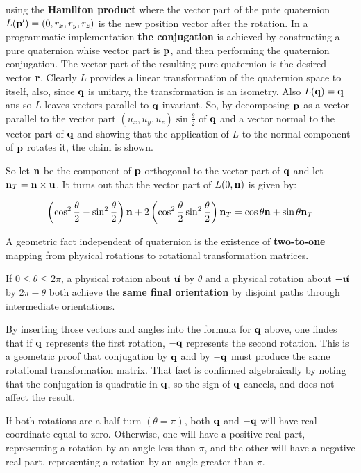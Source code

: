 using the \textbf{Hamilton product} where the vector part of the pute quaternion
$ L(\mathbf{p}') = (0, r_x, r_y, r_z) $ is the new position vector after the rotation.
In a programmatic implementation \textbf{the conjugation} is achieved by constructing
a pure quaternion whise vector part is $ \mathbf{p} $, and then performing the quaternion
conjugation. The vector part of the resulting pure quaternion is the desired
vector $ \mathbf{r} $. Clearly $ L $ provides a linear transformation of the quaternion
space to itself, also, since $ \mathbf{q} $ is unitary, the transformation is an
isometry. Also $ L(\mathbf{q}) = \mathbf{q} $ ans so $ L $ leaves vectors parallel to
$ \mathbf{q} $ invariant. So, by decomposing $ \mathbf{p} $ as a vector parallel to the
vector part $ (u_x, u_y, u_z) \sin \frac{\theta}{2} $ of $ \mathbf{q} $ and a vector
normal to the vector part of $ \mathbf{q} $ and showing that the application of
$ L $ to the normal component of $ \mathbf{p} $ rotates it, the claim is shown.

So let $ \mathbf{n} $ be the component of $ \mathbf{p} $ orthogonal to the vector part
of $ \mathbf{q} $ and let $ \mathbf{n}_T = \mathbf{n} \times \mathbf{u} $. It turns out that the
vector part of $ L(0, \mathbf{n}) $ is given by:

\begin{equation}
    \left(\cos^2 \frac{\theta}{2} - \sin^2 \frac{\theta}{2} \right) \mathbf{n}
    + 2 \left(\cos^2 \frac{\theta}{2} \sin^2 \frac{\theta}{2} \right) \mathbf{n}_T
    = \cos \theta \mathbf{n} + \sin \theta \mathbf{n}_T
\end{equation}

A geometric fact independent of quaternion is the existence of \textbf{two-to-one}
mapping from physical rotations to rotational transformation matrices.

If $ 0 \le \theta \le 2 \pi $, a physical rotaion about $ \vec{\mathbf{u}} $ by
$ \theta $ and a physical rotation about $ -\vec{\mathbf{u}} $ by $ 2 \pi - \theta $
both achieve the \textbf{same final orientation} by disjoint paths through
intermediate orientations.

By inserting those vectors and angles into the formula for $ \mathbf{q} $ above,
one findes that if $ \mathbf{q} $ represents the first rotation, $ -\mathbf{q} $
represents the second rotation. This is a geometric proof that conjugation
by $ \mathbf{q} $ and by $ -\mathbf{q} $ must produce the same rotational transformation
matrix. That fact is confirmed algebraically by noting that the conjugation is
quadratic in $ \mathbf{q} $, so the sign of $ \mathbf{q} $ cancels, and does not affect
the result.

If both rotations are a half-turn $ (\theta = \pi) $, both $ \mathbf{q} $ and
$ -\mathbf{q} $ will have real coordinate equal to zero. Otherwise, one will have a positive
real part, representing a rotation by an angle less than $ \pi $, and the other
will have a negative real part, representing a rotation by an angle greater than $ \pi $.

